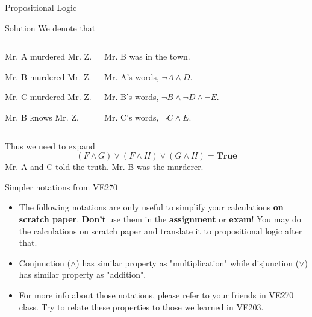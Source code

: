 \begin{frame}{Propositional Logic}\label{murder}
    \begin{block}{Solution}
        We denote that
        \begin{columns}[t,onlytextwidth]
        \begin{description}[]
            \item [A:] Mr. A murdered Mr. Z.
            \item [B:] Mr. B murdered Mr. Z.
            \item [C:] Mr. C murdered Mr. Z.
            \item [D:] Mr. B knows Mr. Z.
        \end{description}
        \begin{description}[]
            \item [E:] Mr. B was in the town.
            \item [F:] Mr. A's words, $\neg A\wedge D$.
            \item [G:] Mr. B's words, $\neg B\wedge \neg D\wedge \neg E$.
            \item [H:] Mr. C's words, $\neg C\wedge E$.
        \end{description}
    \end{columns}
    \medskip
    Thus we need to expand
        $$(F\wedge G)\vee(F\wedge H)\vee(G\wedge H)=\textbf{True}$$
    Mr. A and C told the truth. Mr. B was the murderer.
    \end{block}
\end{frame}

\begin{frame}{Simpler notations from VE270}
    \begin{itemize}
        \item The following notations are only useful to simplify your calculations \textbf{on scratch paper}. \textbf{Don't} use them in the \textbf{assignment} or \textbf{exam}! You may do the calculations on scratch paper and translate it to propositional logic after that.
        \begin{center}
        \end{center}
        
        \item Conjunction ($\wedge$) has similar property as "multiplication" while disjunction ($\vee$) has similar property as "addition".
        
        \item For more info about those notations, please refer to your friends in VE270 class. Try to relate these properties to those we learned in VE203.
    \end{itemize}
\end{frame}


